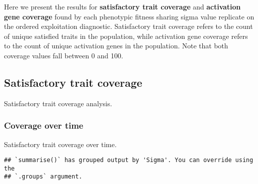 \documentclass[]{book}
\newenvironment{Shaded}{\begin{snugshade}}{\end{snugshade}}
\newcommand{\DataTypeTok}[1]{\textcolor[rgb]{0.13,0.29,0.53}{#1}}
\newcommand{\KeywordTok}[1]{\textcolor[rgb]{0.13,0.29,0.53}{\textbf{#1}}}
\newcommand{\NormalTok}[1]{#1}
\newcommand{\OperatorTok}[1]{\textcolor[rgb]{0.81,0.36,0.00}{\textbf{#1}}}
\newcommand{\StringTok}[1]{\textcolor[rgb]{0.31,0.60,0.02}{#1}}
\begin{document}
Here we present the results for \textbf{satisfactory trait coverage} and \textbf{activation gene coverage} found by each phenotypic fitness sharing sigma value replicate on the ordered exploitation diagnostic.
Satisfactory trait coverage refers to the count of unique satisfied traits in the population, while activation gene coverage refers to the count of unique activation genes in the population.
Note that both coverage values fall between 0 and 100.

\hypertarget{satisfactory-trait-coverage-3}{%
\subsection{Satisfactory trait coverage}\label{satisfactory-trait-coverage-3}}

Satisfactory trait coverage analysis.

\hypertarget{coverage-over-time-11}{%
\subsubsection{Coverage over time}\label{coverage-over-time-11}}

Satisfactory trait coverage over time.

\begin{Shaded}
\end{Shaded}

\begin{verbatim}
## `summarise()` has grouped output by 'Sigma'. You can override using the
## `.groups` argument.
\end{verbatim}
\end{document}
